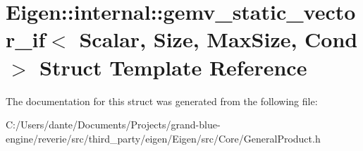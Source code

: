 \hypertarget{struct_eigen_1_1internal_1_1gemv__static__vector__if}{}\section{Eigen\+::internal\+::gemv\+\_\+static\+\_\+vector\+\_\+if$<$ Scalar, Size, Max\+Size, Cond $>$ Struct Template Reference}
\label{struct_eigen_1_1internal_1_1gemv__static__vector__if}


The documentation for this struct was generated from the following file\+:\begin{DoxyCompactItemize}
\item 
C\+:/\+Users/dante/\+Documents/\+Projects/grand-\/blue-\/engine/reverie/src/third\+\_\+party/eigen/\+Eigen/src/\+Core/General\+Product.\+h\end{DoxyCompactItemize}
